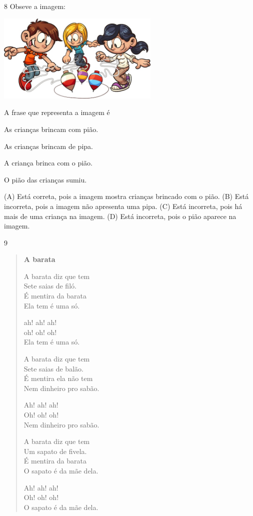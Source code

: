 \num{8} Obseve a imagem:

\includegraphics[width=3.05095in,height=1.66841in]{media/image144.jpeg}


A frase que representa a imagem é

\begin{escolha}
\item As crianças brincam com pião.

\item As crianças brincam de pipa.

\item A criança brinca com o pião.

\item O pião das crianças sumiu.
\end{escolha}


(A) Está correta, pois a imagem mostra crianças brincado com o pião.
(B) Está incorreta, pois a imagem não apresenta uma pipa.
(C) Está incorreta, pois há mais de uma criança na imagem.
(D) Está incorreta, pois o pião aparece na imagem.

\num{9}

\begin{verse}
\textbf{A barata}

A barata diz que tem\\
Sete saias de filó.\\
É mentira da barata\\
Ela tem é uma só.

ah! ah! ah!\\
oh! oh! oh!\\
Ela tem é uma só.

A barata diz que tem\\
Sete saias de balão.\\
É mentira ela não tem\\
Nem dinheiro pro sabão.

Ah! ah! ah!\\
Oh! oh! oh!\\
Nem dinheiro pro sabão.

A barata diz que tem\\
Um sapato de fivela.\\
É mentira da barata\\
O sapato é da mãe dela.

Ah! ah! ah!\\
Oh! oh! oh!\\
O sapato é da mãe dela.
\end{verse}

